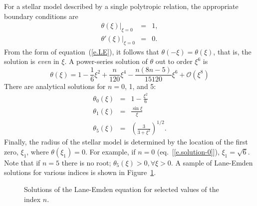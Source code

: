 For a stellar model described by a single polytropic relation, the appropriate boundary conditions are
\begin{eqnarray}
\label{e.thetabc}\left.\theta(\xi)\right|_{\xi = 0} &=& 1,\\
\label{e.thetapbc}\left.\theta'(\xi)\right|_{\xi=0} &=& 0.
\end{eqnarray}
From the form of equation~(\ref{e.LE}), it follows that $\theta(-\xi) = \theta(\xi)$, that is, the solution is \emph{even} in $\xi$. A power-series solution of $\theta$ out to order $\xi^{6}$ is
\begin{equation}\label{e.series}
\theta(\xi) = 1 - \frac{1}{6}\xi^{2} + \frac{n}{120}\xi^{4} - \frac{n(8n-5)}{15120}\xi^{6} + \mathcal{O}(\xi^{8})
\end{equation}
There are analytical solutions for $n = 0$, 1, and 5:
\begin{eqnarray}
\theta_{0}(\xi) &=& 1-\frac{\xi^{2}}{6}\label{e.solution-0}\\
\theta_{1}(\xi) &=& \frac{\sin\xi}{\xi}\label{e.solution-1}\\
\theta_{5}(\xi) &=& \left(\frac{3}{3 + \xi^{2}}\right)^{1/2}.\label{e.solution-5}
\end{eqnarray}
Finally, the radius of the stellar model is determined by the location of the first zero, $\xi_{1}$, where $\theta(\xi_{1}) = 0$.  For example, if $n = 0$ (eq.~[\ref{e.solution-0}]), $\xi_{1} = \sqrt{6}$. Note that if $n=5$ there is no root; $\theta_{5}(\xi) > 0, \forall \xi > 0$.  A sample of Lane-Emden solutions for various indices is shown in Figure~\ref{f.LE-solutions}.

\begin{figure}[htbp]
\caption{Solutions of the Lane-Emden equation for selected values of the index $n$.}
\label{f.LE-solutions}
\end{figure}

